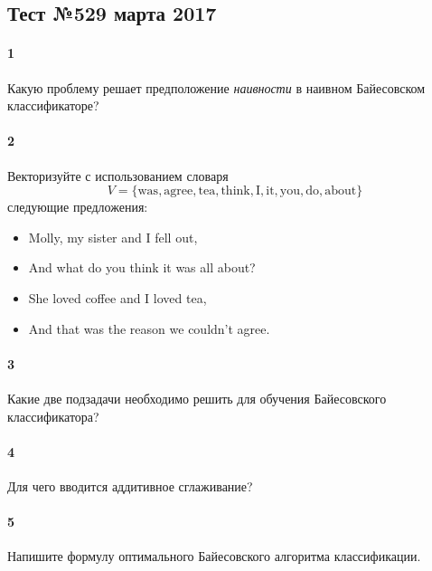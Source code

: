 \documentclass[a4paper,12pt]{article}
\begin{document}
  \subsection*{Тест №5\hfill{29 марта 2017}}

  \paragraph{1} Какую проблему решает предположение \emph{наивности} в наивном
  Байесовском классификаторе?
  
  \makebox[\linewidth]{\hrulefill}
  \makebox[\linewidth]{\hrulefill}
  \makebox[\linewidth]{\hrulefill}  
  \makebox[\linewidth]{\hrulefill}
    
  \paragraph{2} Векторизуйте с использованием словаря
  $$
  V = \{\text{was}, \text{agree}, \text{tea}, \text{think},
        \text{I}, \text{it}, \text{you}, \text{do}, \text{about}\}
  $$
  следующие предложения:
  \begin{itemize}
  \item Molly, my sister and I fell out,
  \item And what do you think it was all about?
  \item She loved coffee and I loved tea,
  \item And that was the reason we couldn't agree.
  \end{itemize}

  \paragraph{3} Какие две подзадачи необходимо решить для обучения Байесовского
  классификатора?

  \makebox[\linewidth]{\hrulefill}
  \makebox[\linewidth]{\hrulefill}
  \makebox[\linewidth]{\hrulefill}
  \makebox[\linewidth]{\hrulefill}

  \paragraph{4} Для чего вводится аддитивное сглаживание?

  
  \makebox[\linewidth]{\hrulefill}
  \makebox[\linewidth]{\hrulefill}
  \makebox[\linewidth]{\hrulefill}
  
  \paragraph{5} Напишите формулу оптимального Байесовского алгоритма классификации.

  \makebox[\linewidth]{\hrulefill}
  \makebox[\linewidth]{\hrulefill}
  \makebox[\linewidth]{\hrulefill}
  \makebox[\linewidth]{\hrulefill}
  
\end{document}

